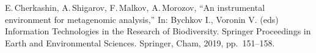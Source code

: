 \documentclass[conference]{IEEEtran} \IEEEoverridecommandlockouts
\begin{document}
\begin{thebibliography}{99}
 E.\,Cherkashin, A.\,Shigarov, F.\,Malkov, A.\,Morozov, ``An instrumental environment for metagenomic analysis,'' In: Bychkov I., Voronin V. (eds) Information Technologies in the Research of Biodiversity. Springer Proceedings in Earth and Environmental Sciences. Springer, Cham, 2019, pp.~151--158. 


\end{thebibliography}
\end{document}
